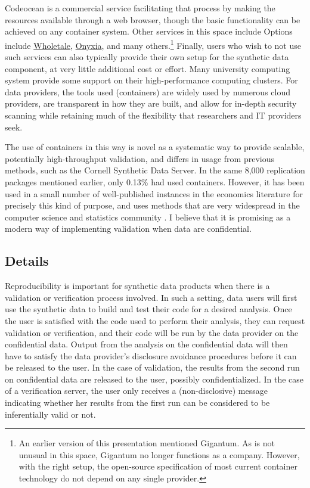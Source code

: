 \documentclass[]{hdsr}
\begin{document}
Codeocean is a commercial service facilitating that process by making the resources available through a web browser, though the basic functionality can be achieved on any container system. Other services in this space include Options include \href{https://wholetale.org}{Wholetale}, \href{https://www.onyxia.sh/}{Onyxia}, and many others.\footnote{An earlier version of this presentation mentioned Gigantum. As is not unusual in this space, Gigantum no longer functions as a company. However, with the right setup, the open-source specification of most current container technology do not depend on any single provider.} Finally, users who wish to not use such services can also typically provide their own setup for the synthetic data component, at very little additional cost or effort. Many university computing system provide some support on their high-performance computing clusters. For data providers, the tools used (containers) are widely used by numerous cloud providers, are transparent in how they are built, and allow for in-depth security scanning while retaining much of the flexibility that researchers and IT providers seek.

The use of containers in this way is novel as a systematic way to provide scalable, potentially high-throughput validation, and differs in usage from previous methods, such as the Cornell Synthetic Data Server. In the same 8,000 replication packages mentioned earlier, only 0.13\% had used containers. However, it has been used in a small number of well-published instances in the economics literature for precisely this kind of purpose, and uses methods that are very widespread in the computer science and statistics community \citep{boettiger_introduction_2015,moreau_containers_2023}. I believe that it is promising as a modern way of implementing validation when data are confidential.

\subsection{Details}


Reproducibility is important for synthetic data products when there
is a validation or verification process involved. In such a setting, data users will first use the synthetic
data to build and test their code for a desired analysis. Once the user is satisfied with the code used to
perform their analysis, they can request validation or verification, and their code will be run by the data provider on the confidential data. Output from the analysis on the confidential data will then have to satisfy the data provider's disclosure avoidance procedures before it can be released to the user. In the case of validation, the results from the second run on confidential data are released to the user, possibly confidentialized. In the case of a verification server, the user only receives a (non-disclosive) message indicating whether her results from the first run can be considered to be inferentially valid or not.
\end{document}

